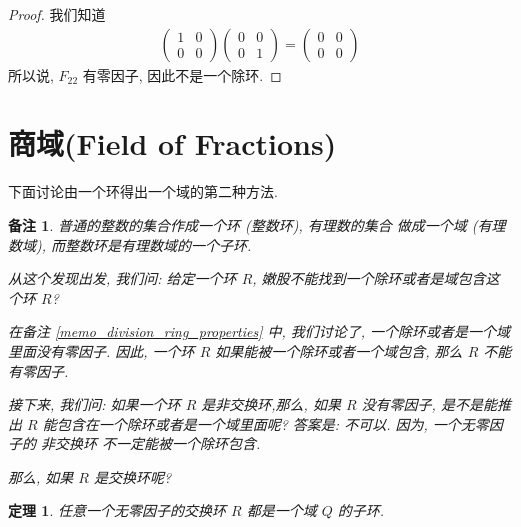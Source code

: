 \documentclass[utf8]{ctexbook}
\newtheorem{theorem}{定理}[section]
\newtheorem{memo}{备注}[section]
\begin{document}
\begin{proof}
我们知道
\begin{align*}
\left(
\begin{array}{cc}
1 & 0 \\
0 & 0
\end{array}
\right)
\left(
\begin{array}{cc}
0 & 0 \\
0 & 1
\end{array}
\right)
=
\left(
\begin{array}{cc}
0 & 0 \\
0 & 0
\end{array}
\right)
\end{align*}
所以说, $F_{22}$ 有零因子, 因此不是一个除环.

\end{proof}

\section{商域(Field of Fractions)}

下面讨论由一个环得出一个域的第二种方法.

\begin{memo}
普通的整数的集合作成一个环 (整数环), 有理数的集合 做成一个域 (有理数域), 而整数环是有理数域的一个子环.

从这个发现出发, 我们问: 给定一个环 $R$, 嫩股不能找到一个除环或者是域包含这个环 $R$?

在备注 \ref{memo_division_ring_properties} 中, 我们讨论了, 一个除环或者是一个域里面没有零因子. 因此, 一个环 $R$ 如果能被一个除环或者一个域包含, 那么 $R$ 不能有零因子.

接下来, 我们问: 如果一个环 $R$ 是非交换环,那么, 如果 $R$ 没有零因子, 是不是能推出 $R$ 能包含在一个除环或者是一个域里面呢? 答案是: 不可以. 因为, 一个无零因子的 非交换环 不一定能被一个除环包含.

那么, 如果 $R$ 是交换环呢?
\end{memo}

\begin{theorem}\label{theorem_R_to_Q}
任意一个无零因子的交换环 $R$ 都是一个域 $Q$ 的子环.
\end{theorem}
\end{document}
